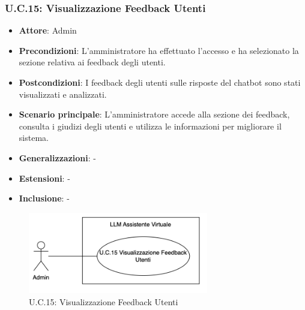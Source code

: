 \subsubsection{U.C.15: Visualizzazione Feedback Utenti}
\begin{itemize}
    \item \textbf{Attore}: Admin
    \item \textbf{Precondizioni}: L'amministratore ha effettuato l'accesso e ha selezionato la sezione relativa ai feedback degli utenti.
    \item \textbf{Postcondizioni}: I feedback degli utenti sulle risposte del chatbot sono stati visualizzati e analizzati.
    \item \textbf{Scenario principale}:  L'amministratore accede alla sezione dei feedback, consulta i giudizi degli utenti e utilizza le informazioni per migliorare il sistema.
    \item \textbf{Generalizzazioni}: -
    \item \textbf{Estensioni}: -
    \item \textbf{Inclusione}: -
\end{itemize}
\begin{figure}[H]
    \centering
    \includegraphics[width=0.7\textwidth]{img/UC15.png}
    \caption{U.C.15: Visualizzazione Feedback Utenti}
\end{figure}
\newpage

